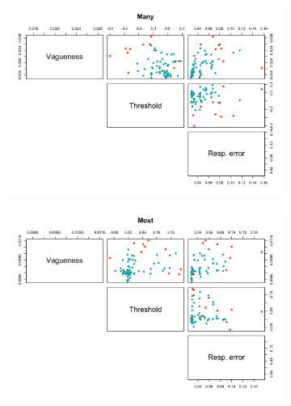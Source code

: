 \documentclass{article}
\begin{document}
\begin{figure} [H]
\begin{minipage}[b]{0.49\textwidth}
    \vspace*{4mm}
    \begin{subfigure}[b]{\linewidth}
     \includegraphics[width=\linewidth]{Figure2.11c.png}
     \caption{\label{fig:fig2.11c}}
    \end{subfigure}
   \end{minipage}
     \hfill
  \begin{minipage}[b]{0.49\textwidth} 
    \begin{subfigure}[b]{\linewidth}
     \includegraphics[width=\linewidth]{Figure2.11d.png}
     \caption{\label{fig:fig2.11d}}
    \end{subfigure}


\end{minipage}
\end{figure}
\end{document}
